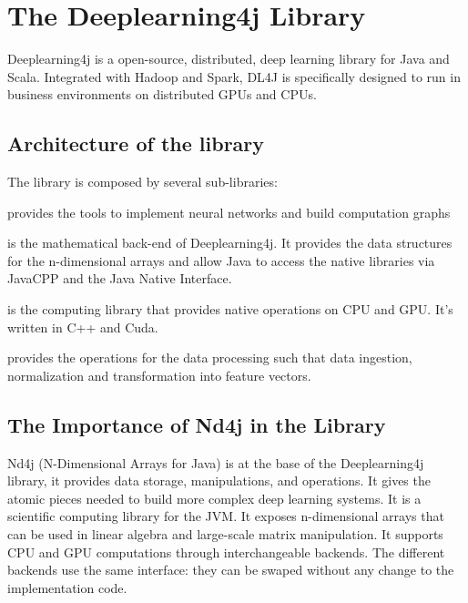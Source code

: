 \chapter{The Deeplearning4j Library}

Deeplearning4j is a open-source, distributed, deep learning library for Java and Scala. Integrated with Hadoop and Spark, DL4J is specifically designed to run in business environments on distributed GPUs and CPUs.

\section{Architecture of the library}
The library is composed by several sub-libraries:

\begin{description}[leftmargin=!,labelwidth=\widthof{\bfseries Deeplearning4j}]
	\item [Deeplearning4j] provides the tools to implement neural networks and build computation graphs
	\item [Nd4j] is the mathematical back-end of Deeplearning4j. It provides the data structures for the n-dimensional arrays and allow Java to access the native libraries via JavaCPP and the Java Native Interface.
	\item [Libnd4j] is the computing library that provides native operations on CPU and GPU. It's written in C++ and Cuda.
	\item [Datavec] provides the operations for the data processing such that data ingestion, normalization and transformation into feature vectors.
\end{description}


\section{The Importance of Nd4j in the Library}
\label{sec:nd4jBlas}

Nd4j (N-Dimensional Arrays for Java) is at the base of the Deeplearning4j library, it provides data storage, manipulations, and operations. It gives the atomic pieces needed to build more complex deep learning systems. It is a scientific computing library for the JVM.  It exposes n-dimensional arrays that can be used in linear algebra and large-scale matrix manipulation. It supports CPU and GPU computations through interchangeable backends. The different backends use the same interface: they can be swaped without any change to the implementation code.

